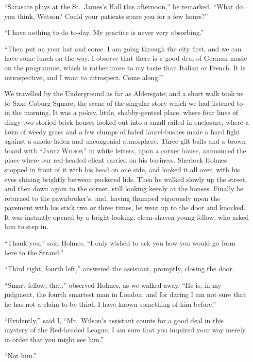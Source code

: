 “Sarasate plays at the St.~James’s Hall this afternoon,” he
remarked. “What do you think, Watson? Could your patients
spare you for a few hours?”

“I have nothing to do to-day. My practice is never very
absorbing.”

“Then put on your hat and come. I am going through
the city first, and we can have some lunch on the way. I
observe that there is a good deal of German music on the
programme, which is rather more to my taste than Italian or
French. It is introspective, and I want to introspect. Come
along!”

We travelled by the Underground as far as Aldersgate;
and a short walk took us to Saxe-Coburg Square, the scene
of the singular story which we had listened to in the morning.
It was a pokey, little, shabby-genteel place, where four
lines of dingy two-storied brick houses looked out into a
small railed-in enclosure, where a lawn of weedy grass and a
few clumps of faded laurel-bushes made a hard fight against
a smoke-laden and uncongenial atmosphere. Three gilt balls
and a brown board with “\textsc{Jabez Wilson}” in white letters,
upon a corner house, announced the place where our red-headed
client carried on his business. Sherlock Holmes
stopped in front of it with his head on one side, and looked
it all over, with his eyes shining brightly between puckered
lids. Then he walked slowly up the street, and then down
again to the corner, still looking keenly at the houses. Finally
he returned to the pawnbroker’s, and, having thumped vigorously
upon the pavement with his stick two or three times,
he went up to the door and knocked. It was instantly
opened by a bright-looking, clean-shaven young fellow, who
asked him to step in.

“Thank you,” said Holmes, “I only wished to ask you
how you would go from here to the Strand.”

“Third right, fourth left,” answered the assistant, promptly,
closing the door.

“Smart fellow, that,” observed Holmes, as we walked away.
“He is, in my judgment, the fourth smartest man in London,
and for daring I am not sure that he has not a claim to be
third. I have known something of him before.”

“Evidently,” said I, “Mr.~Wilson’s assistant counts for a
good deal in this mystery of the Red-headed League. I am
sure that you inquired your way merely in order that you
might see him.”

“Not him.”

